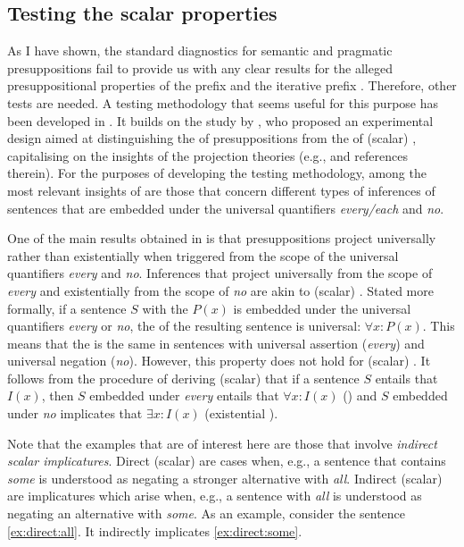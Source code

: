 \subsection{Testing the scalar properties}\label{sec:chemla}
As I have shown, the standard diagnostics for semantic and pragmatic presuppositions fail to provide us with any clear results for the alleged presuppositional properties of the  prefix  and the iterative prefix . Therefore, other tests are needed. A testing methodology that seems useful for this purpose has been developed in \citealt{ZinovaFilip:SALT}. It builds on the study by \citet{Chemla:09}, who proposed an experimental design aimed at distinguishing the  of presuppositions from the  of (scalar) , capitalising on the insights of the  projection theories (e.g., \citealp{Heim:83, Schlenker:08} and references therein). For the purposes of developing the testing methodology, among the most relevant insights of \citet{Chemla:09} are those that concern different types of inferences of sentences that are embedded under the universal quantifiers \textit{every/each} and \textit{no}.

One of the main results obtained in \citealt{Chemla:09} is that presuppositions project universally rather than existentially when triggered from the scope of the universal quantifiers \textit{every} and \textit{no}. Inferences that project universally from the scope of \textit{every} and existentially from the scope of \textit{no} are akin to (scalar) . Stated more formally, if a sentence $S$ with the  $P(x)$ is embedded under the universal quantifiers \textit{every} or \textit{no}, the  of the resulting sentence is universal: $\forall x: P(x)$. This means that the  is the same in sentences with universal assertion (\textit{every}) and universal negation (\textit{no}). However, this property does not hold for (scalar) . It follows from the procedure of deriving (scalar)  that if a sentence $S$ entails that $I(x)$, then $S$ embedded under \textit{every} entails that $\forall x: I(x)$ () and $S$ embedded under \textit{no} implicates that $\exists x: I(x)$ (existential ).

Note that the examples that are of interest here are those that involve \textit{indirect scalar implicatures}. Direct (scalar)  are cases when, e.g., a sentence that contains \textit{some} is understood as negating a stronger alternative with \textit{all}. Indirect (scalar)  are implicatures which arise when, e.g., a sentence with \textit{all} is understood as negating an alternative with \textit{some}. As an example, consider the sentence \ref{ex:direct:all}. It indirectly implicates \ref{ex:direct:some}.

